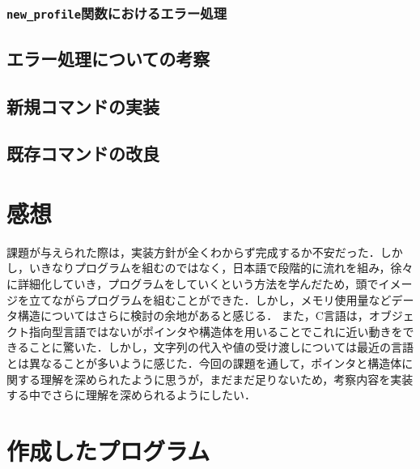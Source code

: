 \documentclass[a4j,11pt]{jarticle}
\begin{document}
\subsubsection{\texttt{new\_profile}関数におけるエラー処理}

\subsection{エラー処理についての考察}
\subsection{新規コマンドの実装}
\subsection{既存コマンドの改良}
\section{感想}
課題が与えられた際は，実装方針が全くわからず完成するか不安だった．しかし，いきなりプログラムを組むのではなく，日本語で段階的に流れを組み，徐々に詳細化していき，プログラムをしていくという方法を学んだため，頭でイメージを立てながらプログラムを組むことができた．しかし，メモリ使用量などデータ構造についてはさらに検討の余地があると感じる．
また，C言語は，オブジェクト指向型言語ではないがポインタや構造体を用いることでこれに近い動きをできることに驚いた．しかし，文字列の代入や値の受け渡しについては最近の言語とは異なることが多いように感じた．今回の課題を通して，ポインタと構造体に関する理解を深められたように思うが，まだまだ足りないため，考察内容を実装する中でさらに理解を深められるようにしたい．
\section{作成したプログラム}\label{sec:program}
\end{document}
